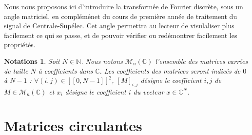 \documentclass[11pt,oneside]{article}
\newtheorem{notations}[theorem]{Notations}
\begin{document}
Nous nous proposons ici d'introduire la transformée de Fourier discrète, sous un angle matriciel, en compléménet du cours de première année de traitement du signal de Centrale-Supélec. Cet angle permettra au lecteur de visulaliser plus facilement ce qui se passe, et de pouvoir vérifier ou redémontrer facilement les propriétés.

\begin{notations}


Soit $N \in \mathbb{N}$. Nous notons $\mathcal{M}_n(\mathbb{C})$ l'ensemble des matrices carrées de taille $N$ à coefficients dans $\mathbb{C}$. Les coefficients des matrices seront indicés de $0$ à $N-1$ : 
$\forall (i,j) \in [\![0,N-1]\!]^2$, $[M]_{i,j}$ désigne le coefficient $i,j$ de $M \in \mathcal{M}_n(\mathbb{C})$ et $x_i$ désigne le coefficient $i$ du vecteur $x \in \mathbb{C}^N$.


\end{notations}


\section{Matrices circulantes}






\end{document}
